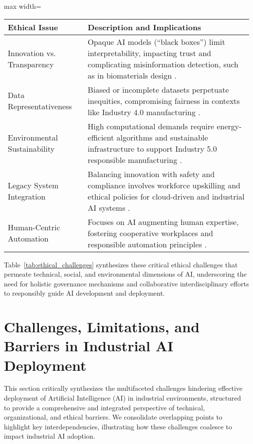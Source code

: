 \documentclass[sigconf]{acmart}
\begin{document}
\begin{table*}[htbp]
\centering
\caption{Summary of Key Cross-Cutting Ethical Challenges in AI Development and Deployment}
\label{tab:ethical_challenges}
\begin{adjustbox}{max width=\textwidth}
\begin{tabular}{ll}
\toprule
\textbf{Ethical Issue} & \textbf{Description and Implications} \\
\bottomrule
Innovation vs. Transparency & Opaque AI models (“black boxes”) limit interpretability, impacting trust and complicating misinformation detection, such as in biomaterials design \cite{ref7,ref8}. \\
Data Representativeness & Biased or incomplete datasets perpetuate inequities, compromising fairness in contexts like Industry 4.0 manufacturing \cite{ref37,ref20,ref38}. \\
Environmental Sustainability & High computational demands require energy-efficient algorithms and sustainable infrastructure to support Industry 5.0 responsible manufacturing \cite{ref19,ref6}. \\
Legacy System Integration & Balancing innovation with safety and compliance involves workforce upskilling and ethical policies for cloud-driven and industrial AI systems \cite{ref11,ref12,ref38}. \\
Human-Centric Automation & Focuses on AI augmenting human expertise, fostering cooperative workplaces and responsible automation principles \cite{ref2}. \\
\bottomrule
\end{tabular}
\end{adjustbox}
\end{table*}

Table~\ref{tab:ethical_challenges} synthesizes these critical ethical challenges that permeate technical, social, and environmental dimensions of AI, underscoring the need for holistic governance mechanisms and collaborative interdisciplinary efforts to responsibly guide AI development and deployment.

\section{Challenges, Limitations, and Barriers in Industrial AI Deployment}

This section critically synthesizes the multifaceted challenges hindering effective deployment of Artificial Intelligence (AI) in industrial environments, structured to provide a comprehensive and integrated perspective of technical, organizational, and ethical barriers. We consolidate overlapping points to highlight key interdependencies, illustrating how these challenges coalesce to impact industrial AI adoption.
\end{document}

